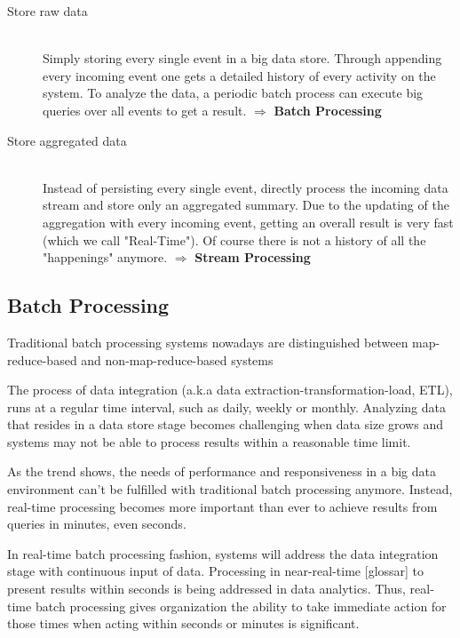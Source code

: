 \begin{description}
    \item[Store raw data]  \hfill \\
    {Simply storing every single event in a big data store. Through appending
    every incoming event one gets a detailed history of every activity on the system.
    To analyze the data, a periodic batch process can execute big queries over
    all events to get a result.  $ \Rightarrow $  \textbf{Batch Processing}}
    \item[Store aggregated data  ] \hfill \\
    {Instead of persisting every single event, directly process the incoming data stream and store
    only an aggregated summary. Due to the updating of the aggregation with every
    incoming event, getting an overall result is very fast (which we call
    "Real-Time"). Of course there is not a history of all the "happenings"
    anymore. $ \Rightarrow $ \textbf{Stream Processing}} 
\end{description}
\cite{TalkKleppmann}


\subsection{Batch Processing}
\label{intro-datastream-batchprocessing}
Traditional batch processing systems nowadays are distinguished between
map-reduce-based and non-map-reduce-based systems 

The process of  data integration (a.k.a data extraction-transformation-load, ETL), 
runs at a regular time interval, such as daily, weekly or
monthly. Analyzing data that resides in a data store stage becomes
challenging when data size grows and systems may not be able to process results
within a reasonable time limit. \cite{Liu:2014:SRP:2628194.2628251}

As the trend shows, the needs of performance and responsiveness in a big data
environment can't be fulfilled with traditional batch processing anymore.
Instead, real-time processing becomes more important than ever to achieve
results from queries in minutes, even seconds. 
\cite{bange2013big}

In real-time batch processing fashion, systems will address the data integration stage
with continuous input of data. Processing in near-real-time [glossar] to present 
results within seconds is being addressed in data analytics. Thus,
real-time batch processing gives organization the ability to take immediate action
for those times when acting within seconds or minutes is significant.
\cite{PrpSvyOfDSPS}


